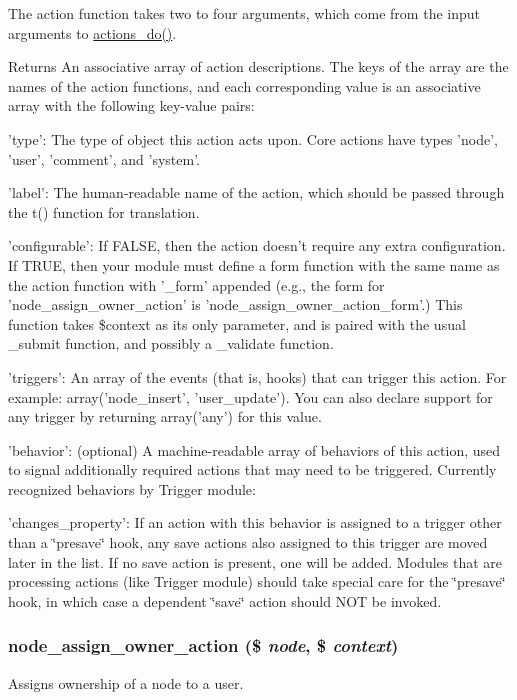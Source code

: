 The action function takes two to four arguments, which come from the input arguments to \hyperlink{group__actions_gacfece93b3453da7c572057dde3453122}{actions\_\-do()}.

\begin{DoxyReturn}{Returns}
An associative array of action descriptions. The keys of the array are the names of the action functions, and each corresponding value is an associative array with the following key-\/value pairs:
\begin{DoxyItemize}
\item 'type': The type of object this action acts upon. Core actions have types 'node', 'user', 'comment', and 'system'.
\item 'label': The human-\/readable name of the action, which should be passed through the t() function for translation.
\item 'configurable': If FALSE, then the action doesn't require any extra configuration. If TRUE, then your module must define a form function with the same name as the action function with '\_\-form' appended (e.g., the form for 'node\_\-assign\_\-owner\_\-action' is 'node\_\-assign\_\-owner\_\-action\_\-form'.) This function takes \$context as its only parameter, and is paired with the usual \_\-submit function, and possibly a \_\-validate function.
\item 'triggers': An array of the events (that is, hooks) that can trigger this action. For example: array('node\_\-insert', 'user\_\-update'). You can also declare support for any trigger by returning array('any') for this value.
\item 'behavior': (optional) A machine-\/readable array of behaviors of this action, used to signal additionally required actions that may need to be triggered. Currently recognized behaviors by Trigger module:
\begin{DoxyItemize}
\item 'changes\_\-property': If an action with this behavior is assigned to a trigger other than a \char`\"{}presave\char`\"{} hook, any save actions also assigned to this trigger are moved later in the list. If no save action is present, one will be added. Modules that are processing actions (like Trigger module) should take special care for the \char`\"{}presave\char`\"{} hook, in which case a dependent \char`\"{}save\char`\"{} action should NOT be invoked. 
\end{DoxyItemize}
\end{DoxyItemize}
\end{DoxyReturn}
\hypertarget{group__actions_ga35a1ee4e6845f1031ef84ef787252efd}{
\subsubsection[{node\_\-assign\_\-owner\_\-action}]{\setlength{\rightskip}{0pt plus 5cm}node\_\-assign\_\-owner\_\-action (\$ {\em node}, \/  \$ {\em context})}}
\label{group__actions_ga35a1ee4e6845f1031ef84ef787252efd}
Assigns ownership of a node to a user.


